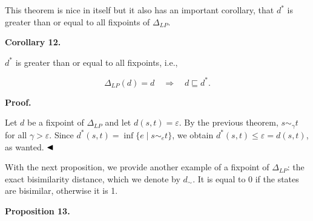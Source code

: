  
This theorem is nice in itself but it also has an important corollary, that $d^{*}$ is greater than or equal to all fixpoints of $\Delta_{LP}$.\par
 
 
 
\par\medskip\noindent\textbf{Corollary 12.}\par
 
 
$d^{*}$ is greater than or equal to all fixpoints, i.e.,\par
  
\par  \quad  \[\Delta_{LP}(d)=d\quad\Longrightarrow\quad d\sqsubseteq d^{*}.\]\quad  \quad  
  
 
 
 
 
\par\medskip\noindent\textbf{Proof.}\par
 
 
Let $d$ be a fixpoint of $\Delta_{LP}$ and let $d(s,t)=\varepsilon$. By the previous theorem, $s\sim_{\gamma}t$ for all $\gamma>\varepsilon$. Since $d^{*}(s,t)=\inf\{e\mid s\sim_{e}t\}$, we obtain $d^{*}(s,t)\leq\varepsilon=d(s,t)$, as wanted. $\hfill\blacktriangleleft$\par
 
 
 
With the next proposition, we provide another example of a fixpoint of $\Delta_{LP}$: the exact bisimilarity distance, which we denote by $d_{\sim}$. It is equal to 0 if the states are bisimilar, otherwise it is 1.\par
 
 
 
\par\medskip\noindent\textbf{Proposition 13.}\par
 
